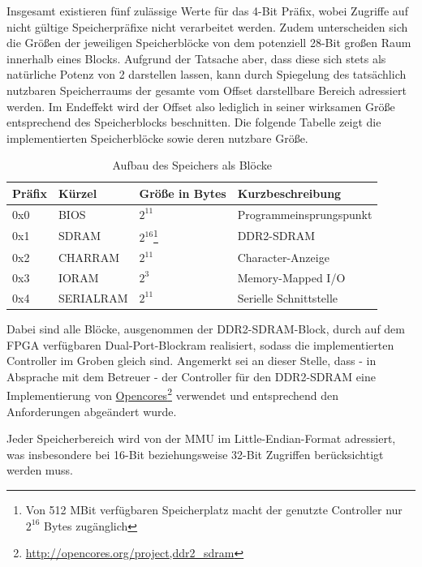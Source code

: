 Insgesamt existieren f\"unf zul\"assige Werte f\"ur das 4-Bit Pr\"afix, wobei Zugriffe auf nicht g\"ultige Speicherpr\"afixe nicht verarbeitet werden. Zudem unterscheiden sich die Gr\"o\ss{}en der jeweiligen Speicherbl\"ocke von dem potenziell 28-Bit gro\ss{}en Raum innerhalb eines Blocks. Aufgrund der Tatsache aber, dass diese sich stets als nat\"urliche Potenz von 2 darstellen lassen, kann durch Spiegelung des tats\"achlich nutzbaren Speicherraums der gesamte vom Offset darstellbare Bereich adressiert werden. Im Endeffekt wird der Offset also lediglich in seiner wirksamen Gr\"o\ss{}e entsprechend des Speicherblocks beschnitten. Die folgende Tabelle zeigt die implementierten Speicherbl\"ocke sowie deren nutzbare Gr\"o\ss{}e.

\begin{table}[H]
	\begin{center}
	\begin{tabular}{| l | l | l | l |}
		\hline
		Pr\"afix & K\"urzel & Gr\"o\ss{}e in Bytes & Kurzbeschreibung \\ \hline
		0x0 & BIOS & $2^{11}$ & Programmeinsprungspunkt \\ \hline
		0x1 & SDRAM & $2^{16}$\footnote{Von 512 MBit verf\"ugbaren Speicherplatz macht der genutzte Controller nur $2^{16}$ Bytes zug\"anglich} & DDR2-SDRAM \\ \hline
		0x2 & CHARRAM & $2^{11}$ & Character-Anzeige \\ \hline
		0x3 & IORAM & $2^{3}$ & Memory-Mapped I/O \\ \hline
		0x4 & SERIALRAM & $2^{11}$ & Serielle Schnittstelle \\ \hline
	\end{tabular}
	\end{center}
	\label{tab:ramlayout}
	\caption{Aufbau des Speichers als Bl\"ocke}
\end{table}

Dabei sind alle Bl\"ocke, ausgenommen der DDR2-SDRAM-Block, durch auf dem FPGA verf\"ugbaren Dual-Port-Blockram realisiert, sodass die implementierten Controller im Groben gleich sind. Angemerkt sei an dieser Stelle, dass - in Absprache mit dem Betreuer - der Controller f\"ur den DDR2-SDRAM eine Implementierung von \href{http://opencores.org/project,ddr2_sdram}{Opencores}\footnote{\url{http://opencores.org/project,ddr2_sdram}} verwendet und entsprechend den Anforderungen abge\"andert wurde.

Jeder Speicherbereich wird von der MMU im Little-Endian-Format adressiert, was insbesondere bei 16-Bit beziehungsweise 32-Bit Zugriffen ber\"ucksichtigt werden muss.

